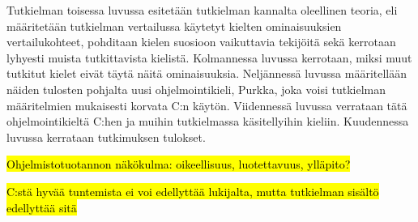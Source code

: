 Tutkielman toisessa luvussa esitetään tutkielman kannalta oleellinen
teoria, eli määritetään tutkielman vertailussa käytetyt kielten ominaisuuksien
vertailukohteet, pohditaan kielen suosioon vaikuttavia tekijöitä sekä kerrotaan
lyhyesti muista tutkittavista kielistä. Kolmannessa luvussa kerrotaan, miksi
muut tutkitut kielet eivät täytä näitä ominaisuuksia. Neljännessä luvussa
määritellään näiden tulosten pohjalta uusi ohjelmointikieli, Purkka, joka voisi
tutkielman määritelmien mukaisesti korvata C:n käytön. Viidennessä luvussa
verrataan tätä ohjelmointikieltä C:hen ja muihin tutkielmassa käsitellyihin
kieliin. Kuudennessa luvussa kerrataan tutkimuksen tulokset.

\hl{Ohjelmistotuotannon näkökulma: oikeellisuus, luotettavuus, ylläpito?}

\hl{C:stä hyvää tuntemista ei voi edellyttää lukijalta, mutta tutkielman
sisältö edellyttää sitä}
